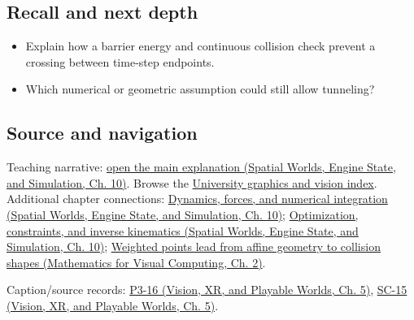 \subsection{Recall and next depth}\label{appendix-a9ba01fa72a6-recall-and-next-depth}

\hypertarget{appendix-a9ba01fa72a6-recall-and-next-depth}{}

\begin{itemize}
\tightlist
\item
  Explain how a barrier energy and continuous collision check prevent a crossing between time-step endpoints.
\item
  Which numerical or geometric assumption could still allow tunneling?
\end{itemize}

\subsection{Source and navigation}\label{appendix-a9ba01fa72a6-source-and-navigation}

\hypertarget{appendix-a9ba01fa72a6-source-and-navigation}{}

Teaching narrative: \href{../05-Spatial-Worlds-Engine-State-and-Simulation/main.pdf\#nameddest=04-visual-computing-ii-ch029-dynamics-forces-and-numerical-integration}{open the main explanation (Spatial Worlds, Engine State, and Simulation, Ch. 10)}. Browse the \hyperref[appendix-a6d556a4ef50-university-graphics-vision-and-photography---independent-series]{University graphics and vision index}. Additional chapter connections: \href{../05-Spatial-Worlds-Engine-State-and-Simulation/main.pdf\#nameddest=04-visual-computing-ii-ch029-dynamics-forces-and-numerical-integration}{Dynamics, forces, and numerical integration (Spatial Worlds, Engine State, and Simulation, Ch. 10)}; \href{../05-Spatial-Worlds-Engine-State-and-Simulation/main.pdf\#nameddest=04-visual-computing-ii-ch029-optimization-constraints-and-inverse-kinematics}{Optimization, constraints, and inverse kinematics (Spatial Worlds, Engine State, and Simulation, Ch. 10)}; \href{../02-Mathematics-for-Visual-Computing/main.pdf\#nameddest=01-foundations-i-ch018-weighted-points-lead-from-affine-geometry-to-collision-shapes}{Weighted points lead from affine geometry to collision shapes (Mathematics for Visual Computing, Ch. 2)}.

Caption/source records: \href{../07-Vision-XR-and-Playable-Worlds/main.pdf\#nameddest=04-visual-computing-ii-ch036-p3-16---subdivision-surfaces-part-1}{P3-16 (Vision, XR, and Playable Worlds, Ch. 5)}, \href{../07-Vision-XR-and-Playable-Worlds/main.pdf\#nameddest=04-visual-computing-ii-ch036-sc-15---stanford-cs231n-deep-learning-for-computer-vision-spring-2025-lecture-15-3d-vision}{SC-15 (Vision, XR, and Playable Worlds, Ch. 5)}.
